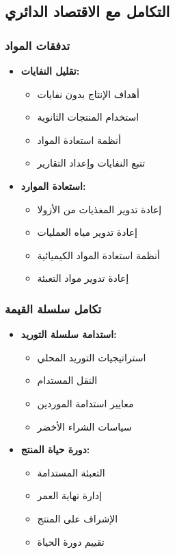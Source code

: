 \subsection{التكامل مع الاقتصاد الدائري}

\subsubsection{تدفقات المواد}
\begin{itemize}
    \item \textbf{تقليل النفايات:}
    \begin{itemize}
        \item أهداف الإنتاج بدون نفايات
        \item استخدام المنتجات الثانوية
        \item أنظمة استعادة المواد
        \item تتبع النفايات وإعداد التقارير
    \end{itemize}
    
    \item \textbf{استعادة الموارد:}
    \begin{itemize}
        \item إعادة تدوير المغذيات من الأزولا
        \item إعادة تدوير مياه العمليات
        \item أنظمة استعادة المواد الكيميائية
        \item إعادة تدوير مواد التعبئة
    \end{itemize}
\end{itemize}

\subsubsection{تكامل سلسلة القيمة}
\begin{itemize}
    \item \textbf{استدامة سلسلة التوريد:}
    \begin{itemize}
        \item استراتيجيات التوريد المحلي
        \item النقل المستدام
        \item معايير استدامة الموردين
        \item سياسات الشراء الأخضر
    \end{itemize}
    
    \item \textbf{دورة حياة المنتج:}
    \begin{itemize}
        \item التعبئة المستدامة
        \item إدارة نهاية العمر
        \item الإشراف على المنتج
        \item تقييم دورة الحياة
    \end{itemize}
\end{itemize}

